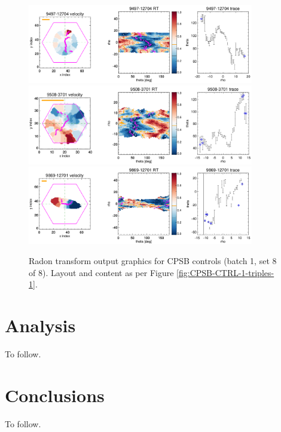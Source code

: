 \documentclass[fleqn,usenatbib]{mnras}
\begin{document}
\begin{figure}
    \centering
    \includegraphics[width=0.88\textwidth]{Images/SN1-MC250/CPSB-CTRL-1-triples/9497-12704-1-250-10.png}
    \includegraphics[width=0.88\textwidth]{Images/SN1-MC250/CPSB-CTRL-1-triples/9508-3701-1-250-10.png}
    \includegraphics[width=0.88\textwidth]{Images/SN1-MC250/CPSB-CTRL-1-triples/9869-12701-1-250-10.png}    
    \caption{Radon transform output graphics for CPSB controls (batch 1, set 8 of 8). Layout and content as per Figure \ref{fig:CPSB-CTRL-1-triples-1}.}
    \label{fig:CPSB-CTRL-1-triples-8}
\end{figure}


\section{Analysis}
\label{sec:analysis}

To follow.

\section{Conclusions}
\label{sec:conclusions}

To follow.



\end{document}
